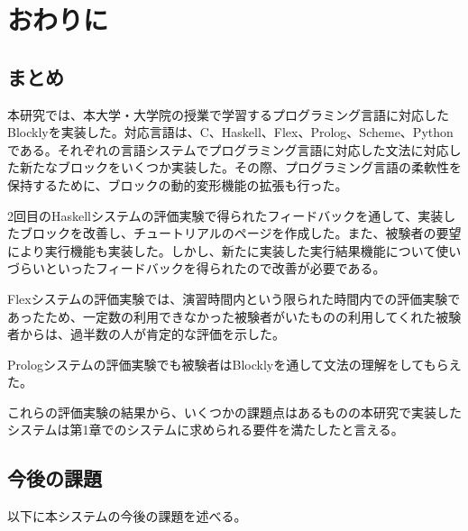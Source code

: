 \documentclass{risepaper}
\begin{document}
   \chapter{おわりに}
   
   \section{まとめ}
   
本研究では、本大学・大学院の授業で学習するプログラミング言語に対応したBlocklyを実装した。対応言語は、C、Haskell、Flex、Prolog、Scheme、Pythonである。それぞれの言語システムでプログラミング言語に対応した文法に対応した新たなブロックをいくつか実装した。その際、プログラミング言語の柔軟性を保持するために、ブロックの動的変形機能の拡張も行った。

2回目のHaskellシステムの評価実験で得られたフィードバックを通して、実装したブロックを改善し、チュートリアルのページを作成した。また、被験者の要望により実行機能も実装した。しかし、新たに実装した実行結果機能について使いづらいといったフィードバックを得られたので改善が必要である。

Flexシステムの評価実験では、演習時間内という限られた時間内での評価実験であったため、一定数の利用できなかった被験者がいたものの利用してくれた被験者からは、過半数の人が肯定的な評価を示した。

Prologシステムの評価実験でも被験者はBlocklyを通して文法の理解をしてもらえた。

これらの評価実験の結果から、いくつかの課題点はあるものの本研究で実装したシステムは第1章でのシステムに求められる要件を満たしたと言える。

   \section{今後の課題}
   
以下に本システムの今後の課題を述べる。
   
\end{document}
